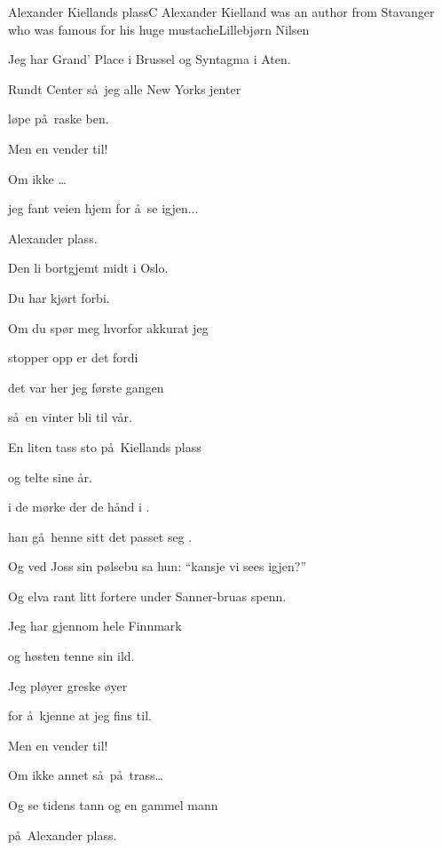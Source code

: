 \begin{SBSong}{Alexander Kiellands plass}{C}
  {Alexander Kielland was an author from Stavanger who was famous for his huge mustache}{Lillebj\o rn Nilsen}
  \begin{SBVerse}
    Jeg har  Grand' Place i Brussel og Syntagma i Aten.

    Rundt  Center s\aa\ jeg alle New Yorks jenter

    l\o pe  p\aa\ raske ben.

    Men en  vender til!

    Om ikke        \ldots {} 

    jeg fant veien hjem for \aa\ se igjen...

    Alexander  plass. 
  \end{SBVerse}
  \begin{SBVerse}
    Den li bortgjemt midt i Oslo.

    Du har  kj\o rt forbi.

    Om du sp\o r meg hvorfor akkurat jeg

    stopper opp er det fordi

    det var her jeg f\o rste gangen

    s\aa\ en vinter bli til v\aa r.

    En liten tass sto p\aa\ Kiellands plass

    og telte sine \aa r.
  \end{SBVerse}
  \begin{SBVerse}
     i de m\o rke  der  de h\aa nd i .

     han g\aa\ henne  sitt  det passet seg .  

    Og ved Joss sin p\o lsebu sa hun: ``kansje vi sees igjen?''

    Og elva rant litt fortere under Sanner-bruas spenn.
  \end{SBVerse}
  \CBPageBrk
  \begin{SBVerse}
    Jeg har  gjennom hele Finnmark

    og  h\o sten tenne sin ild.

    Jeg pl\o yer greske \o yer

    for \aa\ kjenne at jeg fins til.

    Men en  vender til!

    Om ikke annet s\aa\ p\aa\ trass\ldots

    Og se tidens tann og en gammel mann

    p\aa\ Alexander  plass. 
  \end{SBVerse}
\end{SBSong}

